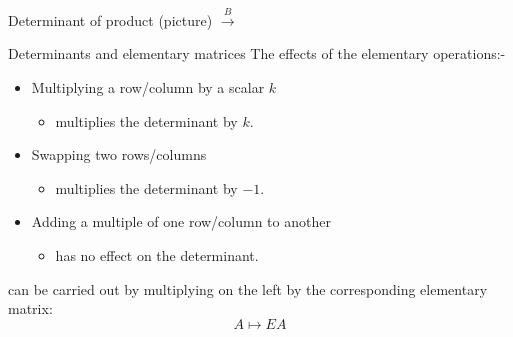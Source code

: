 \documentclass{beamer}
\begin{document}
\begin{frame}{Determinant of product (picture)}
  $\xrightarrow{B}$
\end{frame}

\begin{frame}{Determinants and elementary matrices}
  The effects of the elementary operations:-
  \begin{itemize}
  \item Multiplying a row/column by a scalar $k$
    \begin{itemize}
    \item multiplies the determinant by $k$.
    \end{itemize}\vfill
  \item Swapping two rows/columns
    \begin{itemize}
    \item multiplies the determinant by $-1$.
    \end{itemize}\vfill
  \item Adding a multiple of one row/column to another
    \begin{itemize}
    \item has no effect on the determinant.
    \end{itemize}
  \end{itemize}\vfill
  can be carried out by multiplying on the left by the corresponding elementary matrix:
  \begin{equation*}
    A \mapsto EA
  \end{equation*}
\end{frame}
\end{document}
